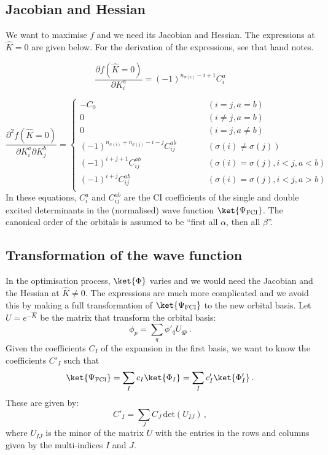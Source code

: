 \documentclass[a4paper,11pt]{article}
\begin{document}
\subsection{Jacobian and Hessian}

We want to maximise $f$ and we need its Jacobian and Hessian.
The expressions at $\hat{K} = 0$ are given below.
For the derivation of the expressions, see that hand notes.

\begin{equation}
  \frac{\partial f(\hat{K} = 0)}{\partial K_i^a} = (-1)^{n_{\sigma(i)} - i + 1} C_i^a
\end{equation}

\begin{equation}
  \frac{\partial^2 f(\hat{K} = 0)}{\partial K_i^a \partial K_j^b} =
  \left\{
    \begin{array}{lcr}
      -C_0 & \quad\quad & (i = j, a = b)\\
      0 & \quad\quad & (i \ne j, a = b)\\
      0 & \quad\quad & (i = j, a \ne b)\\
      (-1)^{n_{\sigma(i)}+n_{\sigma(j)}-i-j}C_{ij}^{ab} & \quad\quad & (\sigma(i) \ne \sigma(j))\\
      (-1)^{i+j+1}C_{ij}^{ab} & \quad\quad & (\sigma(i) = \sigma(j), i<j, a<b)\\
      (-1)^{i+j}C_{ij}^{ab} & \quad\quad & (\sigma(i) = \sigma(j), i<j, a>b)\\
    \end{array}
  \right.
\end{equation}
In these equations, $C_i^a$ and $C_{ij}^{ab}$ are the CI coefficients of the single and double excited determinants in the (normalised) wave function $\ket{\Psi_\text{FCI}}$.
The canonical order of the orbitals is assumed to be ``first all $\alpha$, then all $\beta$''.

\subsection{Transformation of the wave function}
In the optimisation process, $\ket{\Phi}$ varies and we would need the Jacobian and the Hessian at $\hat{K} \ne 0$.
The expressions are much more complicated and we avoid this by making a full transformation of $\ket{\Psi_\text{FCI}}$ to the new orbital basis.
Let $U = e^{-\hat{K}}$ be the matrix that transform the orbital basis:
\begin{equation}
  \phi_p = \sum_q \phi'_q U_{qp}\,.
\end{equation}
Given the coefficients $C_I$ of the expansion in the first basis, we want to know the coefficients $C'_I$ such that
\begin{equation}
  \ket{\Psi_\text{FCI}} = \sum_I c_I \ket{\Phi_I} = \sum_I c'_I \ket{\Phi'_I}\,.
\end{equation}
These are given by:
\begin{equation}\label{eq:trans_fci_orbital_basis}
  C'_I = \sum_J C_J\, \text{det}(U_{IJ})\,,
\end{equation}
where $U_{IJ}$ is the minor of the matrix $U$ with the entries in the rows and columns given by the multi-indices $I$ and $J$.
\end{document}
